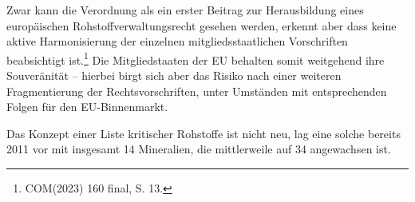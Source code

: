 \documentclass[12pt,a4paper,oneside]{book} %
\begin{document}
	Zwar kann die Verordnung als ein erster Beitrag zur Herausbildung eines europäischen Rohstoffverwaltungsrecht gesehen werden, erkennt aber dass keine aktive Harmonisierung der einzelnen mitgliedsstaatlichen Vorschriften beabsichtigt ist.\footnote{COM(2023) 160 final, S. 13.} Die Mitgliedstaaten der EU behalten somit weitgehend ihre Souveränität -- hierbei birgt sich aber das Risiko nach einer weiteren Fragmentierung der Rechtsvorschriften, unter Umständen mit entsprechenden Folgen für den EU-Binnenmarkt.
	
	
	Das Konzept einer Liste kritischer Rohstoffe ist nicht neu, lag eine solche bereits 2011 vor mit insgesamt 14 Mineralien, die mittlerweile auf 34 angewachsen ist.
	
\end{document}
